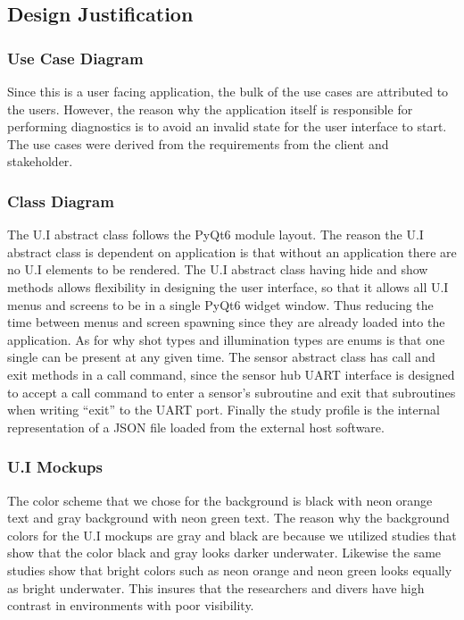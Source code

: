 \subsection{Design Justification}
\subsubsection{Use Case Diagram}
Since this is a user facing application, the bulk of the use cases are attributed to the users. However, the reason why the application itself is responsible for performing diagnostics is to avoid an invalid state for the user interface to start. The use cases were derived from the requirements from the client and stakeholder.
\subsubsection{Class Diagram}
The U.I abstract class follows the PyQt6 module layout. The reason the U.I abstract class is dependent on application is that without an application there are no U.I elements to be rendered. The U.I abstract class having hide and show methods allows flexibility in designing the user interface, so that it allows all U.I menus and screens to be in a single PyQt6 widget window. Thus reducing the time between menus and screen spawning since they are already loaded into the application. As for why shot types and illumination types are enums is that one single can be present at any given time. The sensor abstract class has call and exit methods in a call command, since the sensor hub UART interface is designed to accept a call command to enter a sensor's subroutine and exit that subroutines when writing ``exit'' to the UART port. Finally the study profile is the internal representation of a JSON file loaded from the external host software.
\subsubsection{U.I Mockups}
The color scheme that we chose for the background is black with neon orange text and gray background with neon green text. The reason why the background colors for the U.I mockups are gray and black are because we utilized studies that show that the color black and gray looks darker underwater.\cite{AquaticSafetyGroup2021}\cite{FluoGreenMost2018} Likewise the same studies show that bright colors such as neon orange and neon green looks equally as bright underwater.\cite{AquaticSafetyGroup2021}\cite{FluoGreenMost2018} This insures that the researchers and divers have high contrast in environments with poor visibility.